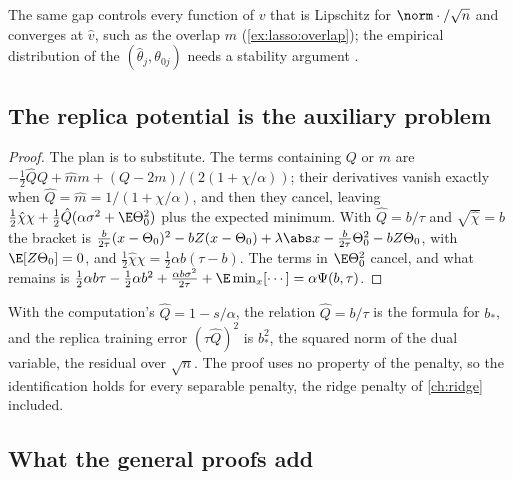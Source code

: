 \begin{refsection}
The same gap controls every function of $v$ that is Lipschitz for $\norm\cdot/\sqrt n$ and converges at $\hat v$, such as the overlap $m$ (\cref{ex:lasso:overlap}); the empirical distribution of the $(\hat\theta_j,\theta_{0j})$ needs a stability argument \parencite{MiolaneMontanari2021}.

\subsection{The replica potential is the auxiliary problem}\label{sec:lasso:rsao}


\begin{proof}
The plan is to substitute. The terms containing $Q$ or $m$ are $-\frac12\hat QQ+\hat mm+(Q-2m)/(2(1+\chi/\alpha))$; their derivatives vanish exactly when $\hat Q=\hat m=1/(1+\chi/\alpha)$, and then they cancel, leaving $\frac12\hat\chi\chi+\frac12\hat Q(\alpha\sigma^2+\E\Theta_0^2)$ plus the expected minimum. With $\hat Q=b/\tau$ and $\sqrt{\hat\chi}=b$ the bracket is $\frac b{2\tau}(x-\Theta_0)^2-bZ(x-\Theta_0)+\lambda\abs x-\frac b{2\tau}\Theta_0^2-bZ\Theta_0$, with $\E[Z\Theta_0]=0$, and $\frac12\hat\chi\chi=\frac12\alpha b(\tau-b)$. The terms in $\E\Theta_0^2$ cancel, and what remains is $\frac12\alpha b\tau-\frac12\alpha b^2+\frac{\alpha b\sigma^2}{2\tau}+\E\min_x[\cdots]=\alpha\Psi(b,\tau)$.
\end{proof}

With the computation's $\hat Q=1-s/\alpha$, the relation $\hat Q=b/\tau$ is the formula for $b_*$, and the replica training error $(\tau\hat Q)^2$ is $b_*^2$, the squared norm of the dual variable, the residual over $\sqrt n$. The proof uses no property of the penalty, so the identification holds for every separable penalty, the ridge penalty of \cref{ch:ridge} included.

\subsection{What the general proofs add}\label{sec:lasso:general}


\end{refsection}
